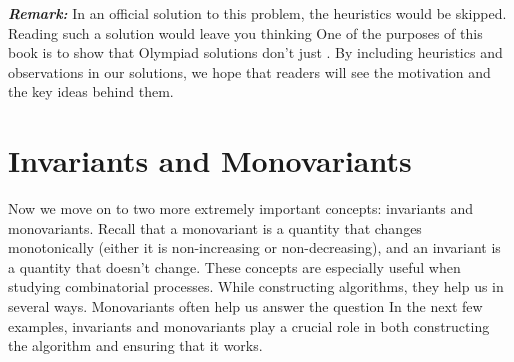 \documentclass[a4paper,11pt]{book}
\begin{document}
\textbf{\textit{Remark:}} In an official solution to this problem, the heuristics would be skipped. Reading such a solution would leave you
thinking  One of the purposes of this book is to show that Olympiad solutions don't just . By including heuristics and observations in our solutions, we hope that readers will see the motivation and the key ideas behind them.
\section{Invariants and Monovariants}
Now we move on to two more extremely important concepts:
invariants and monovariants. Recall that a monovariant is a
quantity that changes monotonically (either it is non-increasing or
non-decreasing), and an invariant is a quantity that doesn't
change. These concepts are especially useful when studying
combinatorial processes. While constructing algorithms, they help
us in several ways. Monovariants often help us answer the
question  In the next few examples,
invariants and monovariants play a crucial role in both
constructing the algorithm and ensuring that it works.
\end{document}
